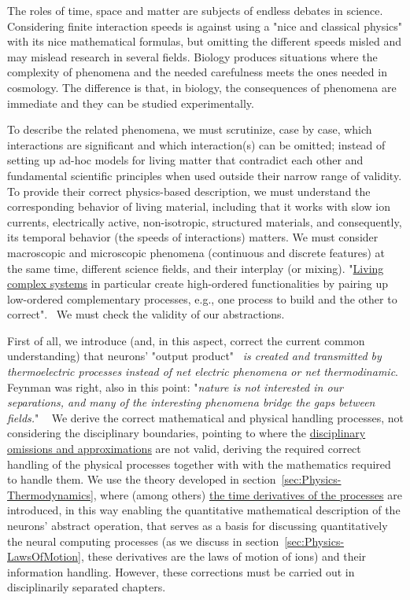 The roles of time, space and matter are subjects of endless debates in science.
Considering finite interaction speeds is against using a "nice and classical physics"
with its nice mathematical formulas, but omitting the different speeds
misled and may mislead research in several fields.
Biology produces situations where the complexity of phenomena
and the needed carefulness meets the ones needed in cosmology.
The difference is that, in biology, the consequences of phenomena are immediate
and they can be studied experimentally.


To describe the related phenomena, we must scrutinize, case by case, which interactions are significant and
which interaction(s) can be omitted; instead of setting up ad-hoc models for living matter that contradict
each other and fundamental scientific principles when used outside their narrow range of validity. To provide their
correct physics-based description, we must understand the corresponding behavior of living material, including that it works with slow ion currents,
electrically active, non-isotropic, structured materials,
and consequently, its temporal behavior (the speeds of interactions)
matters. We must consider macroscopic and microscopic phenomena (continuous and discrete features) at the same time, different
science fields, and their interplay (or mixing). "\href{https://www.pnas.org/doi/10.1073/pnas.1705704114}{Living complex systems} in
particular create high-ordered functionalities by pairing up low-ordered
complementary processes, e.g., one process to build and the other
to correct".~\cite{BiologicalConservationLaw:2017}
We must check the validity of our abstractions.


First of all, we introduce (and, in this aspect, correct the current common understanding)
that neurons' "output product"~\cite{BuzsakiCellAssemblies:2010}
\textit{is created and transmitted by thermoelectric processes instead of
	net electric phenomena or net thermodinamic}.
	Feynman was right, also in this point: "\textit{nature is not interested in our separations, and many of the interesting phenomena bridge the gaps between fields.}" ~\cite{FeynmanThinking:1980}
We derive the correct mathematical and physical handling processes,
not considering the disciplinary boundaries, pointing to where
the \hyperlink{Abstractions}{disciplinary omissions and approximations} are not valid,
deriving the required correct handling of the physical processes together with with the mathematics required to handle them.
We use the theory developed in section~\ref{sec:Physics-Thermodynamics},
where (among others) \hyperlink{NernstPlanckTimeDerivatives}{the time derivatives of the processes} are introduced, in this way enabling the
quantitative mathematical description of the neurons' abstract operation,
that serves as a basis for discussing quantitatively the neural computing
processes (as we discuss in section~\ref{sec:Physics-LawsOfMotion},
these derivatives are the laws of motion of ions) and their information handling. However, these corrections must be carried out
in disciplinarily separated chapters.  


